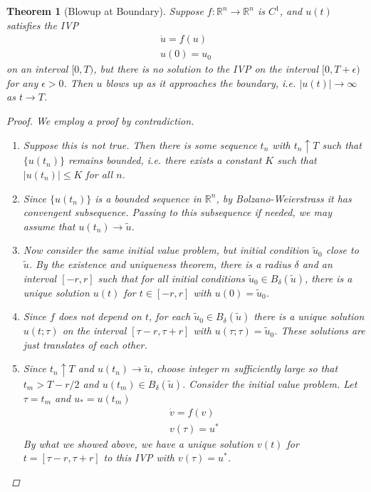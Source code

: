 \documentclass[12pt]{amsart}         %
\newtheorem{theorem}{Theorem}[section]
\theoremstyle{remark}
\newcommand{\R}{\mathbb{R}}
\begin{document}
\begin{theorem}[Blowup at Boundary]
Suppose $f: \R^n \rightarrow \R^n$ is $C^1$, and $u(t)$ satisfies the IVP
\begin{align*}
\dot{u} = f(u) \\
u(0) = u_0 
\end{align*}
on an interval $[0, T)$, but there is no solution to the IVP on the interval $[0, T + \epsilon)$ for any $\epsilon > 0$. Then $u$ blows up as it approaches the boundary, i.e. $|u(t)| \rightarrow \infty$ as $t \rightarrow T$.

\begin{proof}
We employ a proof by contradiction.
\begin{enumerate}
\item Suppose this is not true. Then there is some sequence $t_n$ with $t_n \uparrow T$ such that $\{ u(t_n) \}$ remains bounded, i.e. there exists a constant $K$ such that $|u(t_n)| \leq K$ for all $n$.

\item Since $\{ u(t_n) \}$ is a bounded sequence in $\R^n$, by Bolzano-Weierstrass it has convengent subsequence. Passing to this subsequence if needed, we may assume that $u(t_n) \rightarrow \tilde{u}$.

\item Now consider the same initial value problem, but initial condition $\tilde{u}_0$ close to $\tilde{u}$. By the existence and uniqueness theorem, there is a radius $\delta$ and an interval $[-r, r]$ such that for all initial conditions $\tilde{u}_0 \in B_\delta(\tilde{u})$, there is a unique solution $u(t)$ for $t \in [-r, r]$ with $u(0) = \tilde{u}_0$. 

\item Since $f$ does not depend on $t$, for each $\tilde{u}_0 \in B_\delta(\tilde{u})$ there is a unique solution $u(t; \tau)$ on the interval $[\tau - r, \tau + r]$ with $u(\tau; \tau) = \tilde{u}_0$. These solutions are just translates of each other.

\item Since $t_n \uparrow T$ and $u(t_n) \rightarrow \tilde{u}$, choose integer $m$ sufficiently large so that $t_m > T - r/2$ and
$u(t_m) \in B_\delta(\tilde{u})$. Consider the initial value problem. Let $\tau = t_m$ and $u_* = u(t_m)$
\begin{align*}
\dot{v} = f(v) \\
v(\tau) = u^*
\end{align*}
By what we showed above, we have a unique solution $v(t)$ for $t = [\tau - r, \tau + r]$ to this IVP with $v(\tau) = u^*$.


\end{enumerate}
\end{proof}
\end{theorem}
\end{document}
